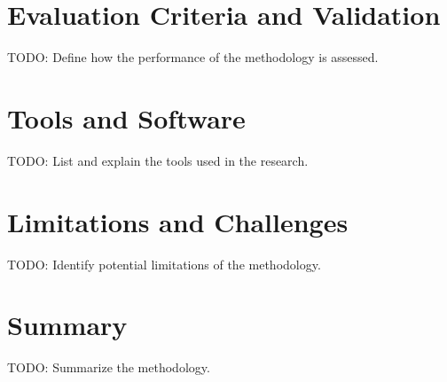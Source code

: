 \section{Evaluation Criteria and Validation}
TODO: Define how the performance of the methodology is assessed.

\section{Tools and Software}
TODO: List and explain the tools used in the research.

\section{Limitations and Challenges}
TODO: Identify potential limitations of the methodology.

\section{Summary}
TODO: Summarize the methodology.

